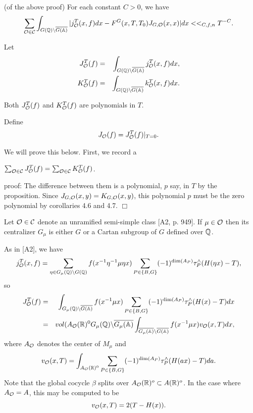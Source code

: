 \begin{corollary}
(of the above proof) For each constant $C>0$, we have 
\[
\sum_{{\cal{O}}\in {\cal{C}}}\int_{G({\Bbb{Q}})\backslash \overline{G(\Bbb{%
A})}}|j_{{\cal{O}}}^T(x,f)dx-F^G(x,T,T_0)J_{G,{\cal{O}}%
}(x,x)|dx<<_{C,f,n}T^{-C}. 
\]
\end{corollary}

Let 
\begin{eqnarray*}
J_{{\cal{O}}}^T(f) &=&\int_{G({\Bbb{Q}})\backslash \overline{G({\Bbb{A}})}}j_{%
{\cal{O}}}^T(x,f)dx, \\
K_{{\cal{O}}}^T(f) &=&\int_{G({\Bbb{Q}})\backslash \overline{G({\Bbb{A}})}}k_{%
{\cal{O}}}^T(x,f)dx.
\end{eqnarray*}

\begin{proposition}
Both $
J_{{\cal{O}}}^T(f)
$ and $K_{{\cal{O}}}^T(f)$ are polynomials in
$T$.
\end{proposition}

Define
\begin{equation}
J_{{\cal{O}}}(f)
=J_{{\cal{O}}}^T(f)|_{T=0}.
\end{equation}

We will prove this below. First, we record a

\begin{corollary}
$\sum_{{\cal{O}}\in {\cal{C}}}J_{{\cal{O}}}^T(f)=\sum_{{\cal{O}}\in 
{\cal{C}}}K_{{\cal{O}}}^T(f)$.
\end{corollary}

proof: The difference between them is a polynomial, $p$ say, in $T$ by the
proposition. Since $J_{G,{\cal{O}}}(x,y)=K_{G,{\cal{O}}}(x,y)$, this
polynomial $p$ must be the zero polynomial by corollaries 4.6 
and 4.7. $\Box $

Let ${\cal{O}}\in {\cal{C}}$ denote an unramified semi-simple class [A2,
p. 949]. If $\mu \in {\cal{O}}$ then its centralizer $G_\mu $ is either $G$
or a Cartan subgroup of $G$ defined over ${\Bbb{Q}}$.

As in [A2], we have 
\begin{equation}
j_{{\cal{O}}}^T(x,f)=
\sum_{\eta \in G_\mu ({\Bbb{Q}})\backslash G({\Bbb{Q}})}
f(x^{-1}\eta ^{-1}\mu \eta x)\sum_{P\in \{B,G\}}(-1)^{\dim (A_P)}
\tau_P^{\wedge }(H(\eta x)-T),
\end{equation}
so 
\begin{eqnarray}
J_{{\cal{O}}}^T(f)
&=&\int_{G_\mu ({\Bbb{Q}})\backslash \overline{G({\Bbb{A}})}}
f(x^{-1}\mu x)\sum_{P\in \{B,G\}}(-1)^{\dim (A_P)}
\tau _P^{\wedge}(H(x)-T)dx \\
&=&vol(A_{{\cal{O}}}({\Bbb{R}})^0G_\mu ({\Bbb{Q}})
\backslash \overline{G_\mu ({\Bbb{A}})}
\int_{\overline{G_\mu ({\Bbb{A}})}\backslash \overline{G({\Bbb{A}})}}
f(x^{-1}\mu x)v_{{\cal{O}}}(x,T)dx,  \nonumber
\end{eqnarray}
where $A_{{\cal{O}}}$ denotes the center of $M_\mu $ and 
\[
v_{{\cal{O}}}(x,T)
=\int_{A_{{\cal{O}}}({\Bbb{R}})^0}\sum_{P\in
\{B,G\}}(-1)^{\dim (A_P)}\tau _P^{\wedge }(H(ax)-T)da. 
\]
Note that the global cocycle $\beta $ splits over
$A_{{\cal{O}}}({\Bbb{R}})^o\subset A({\Bbb{R}})^o$.
In the case where $A_{\cal{O}}=A$, this may be
computed to be 
\[
v_{{\cal{O}}}(x,T)=2(T-H(x)). 
\]

